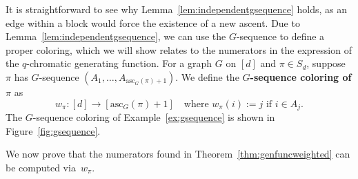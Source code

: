\documentclass[11pt]{amsart}
\newcommand\Def[1]{{\bf #1}}
\newcommand{\ascnum}{\mathrm{asc}}
\begin{document}
It is straightforward to see why Lemma~\ref{lem:independentgsequence} holds, as an edge within a block would force the existence of a new ascent.
Due to Lemma~\ref{lem:independentgsequence}, we can use the $G$-sequence to define a proper coloring, which we will show relates to the numerators in the expression of the $q$-chromatic generating function.
For a graph $G$ on $[d]$ and $\pi \in S_d$, suppose $\pi$ has $G$-sequence $(A_1,\ldots,A_{\ascnum_G(\pi)+1})$.
We define the \Def{$G$-sequence coloring of $\pi$} as 
\[
    w_{\pi}: [d] \to [\ascnum_G(\pi)+1] \quad \text{where } w_\pi(i) :=j \text{ if } i \in A_j.
\]
The $G$-sequence coloring of Example~\ref{ex:gsequence} is shown in Figure~\ref{fig:gsequence}.

We now prove that the numerators found in Theorem~\ref{thm:genfuncweighted} can be computed via~$w_{\pi}$.
\end{document}
